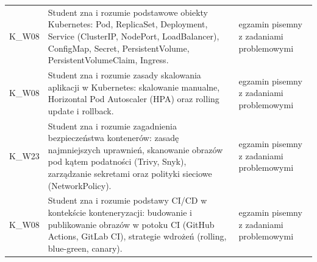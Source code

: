 \documentclass[12pt, a4paper]{article}
\begin{document}
{\begin{longtable}{m{1.6cm}m{9.0cm}m{4.2cm}}
  \rowcolor{tableRowLight} K\_W08 & Student zna i rozumie podstawowe obiekty Kubernetes: Pod, ReplicaSet, Deployment, Service (ClusterIP, NodePort, LoadBalancer), ConfigMap, Secret, PersistentVolume, PersistentVolumeClaim, Ingress. & egzamin pisemny z zadaniami problemowymi \\
  \rowcolor{tableRowAlt} K\_W08 & Student zna i rozumie zasady skalowania aplikacji w Kubernetes: skalowanie manualne, Horizontal Pod Autoscaler (HPA) oraz rolling update i rollback. & egzamin pisemny z zadaniami problemowymi \\
  \rowcolor{tableRowLight} K\_W23 & Student zna i rozumie zagadnienia bezpieczeństwa kontenerów: zasadę najmniejszych uprawnień, skanowanie obrazów pod kątem podatności (Trivy, Snyk), zarządzanie sekretami oraz polityki sieciowe (NetworkPolicy). & egzamin pisemny z zadaniami problemowymi \\
  \rowcolor{tableRowAlt} K\_W08 & Student zna i rozumie podstawy CI/CD w kontekście konteneryzacji: budowanie i publikowanie obrazów w potoku CI (GitHub Actions, GitLab CI), strategie wdrożeń (rolling, blue-green, canary). & egzamin pisemny z zadaniami problemowymi \\
\bottomrule
\end{longtable}}
\end{document}

